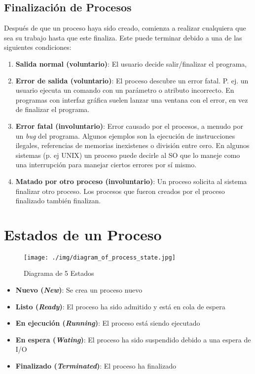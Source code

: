 \documentclass[12pt, a4paper]{article} %
\begin{document}
\subsection{Finalización de Procesos}

Después de que un proceso haya sido creado, comienza a realizar cualquiera que sea su trabajo hasta que este finaliza. Este puede terminar debido a una de las siguientes condiciones:

\begin{enumerate}
	\item \textbf{Salida normal (voluntario)}: El usuario decide salir/finalizar el programa,
	\item \textbf{Error de salida (voluntario)}: El proceso descubre un error fatal. P. ej. un usuario ejecuta un comando con un parámetro o atributo incorrecto. En programas con interfaz gráfica suelen lanzar una ventana con el error, en vez de finalizar el programa.
	\item \textbf{Error fatal (involuntario)}: Error causado por el procesos, a menudo por un \textit{bug} del programa. Algunos ejemplos son la ejecución de instrucciones ilegales, referencias de memorias inexistenes o división entre cero. En algunos sistemas (p. ej UNIX) un proceso puede decirle al SO que lo maneje como una interrupción para manejar ciertos errores por sí mismo.
	\item \textbf{Matado por otro proceso (involuntario)}: Un proceso solicita al sistema finalizar otro proceso. Los procesos que fueron creados por el proceso finalizado también finalizan.
\end{enumerate}

\section{Estados de un Proceso}

\begin{figure}[h]
	\centering
	\texttt{[image: ./img/diagram\_of\_process\_state.jpg]}
	\caption{Diagrama de 5 Estados}
\end{figure}

\begin{itemize}
	\item \textbf{Nuevo (\textit{New})}: Se crea un proceso nuevo
	\item \textbf{Listo (\textit{Ready})}: El proceso ha sido admitido y está en cola de espera
	\item \textbf{En ejecución (\textit{Running})}: El proceso está siendo ejecutado
	\item \textbf{En espera (\textit{Wating})}: El proceso ha sido suspendido debido a una espera de I/O
	\item \textbf{Finalizado (\textit{Terminated})}: El proceso ha finalizado
\end{itemize}
\end{document}
